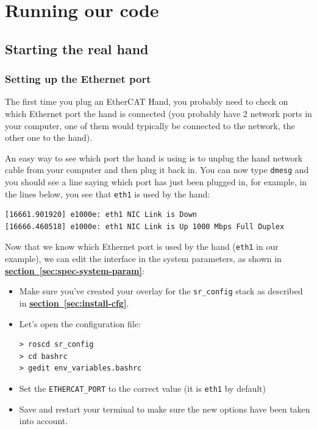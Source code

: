 \documentclass[12pt]{article}
\newcommand{\link}[1]{\hyperref[sec:#1]{\textbf{section~\ref*{sec:#1}}}}
\begin{document}
\newpage

\section{Running our code}
\label{sec:running-our-code}

\subsection{Starting the real hand}
\label{sec:starting-real-hand}

\subsubsection{Setting up the Ethernet port}
\par The first time you plug an EtherCAT Hand, you probably need to check on which Ethernet port the hand is connected (you probably have 2 network ports in your computer, one of them would typically be connected to the network, the other one to the hand).\\

\par An easy way to see which port the hand is using is to unplug the hand network cable from your computer and then plug it back in. You can now type \texttt{dmesg} and you should see a line saying which port has just been plugged in, for example, in the lines below, you see that \texttt{eth1} is used by the hand:
  \begin{lstlisting}[escapeinside='']
[16661.901920] e1000e: eth1 NIC Link is Down
[16666.460518] e1000e: eth1 NIC Link is Up 1000 Mbps Full Duplex
  \end{lstlisting}

\par Now that we know which Ethernet port is used by the hand (\texttt{eth1} in our example), we can edit the interface in the system parameters, as shown in \link{spec-system-param}:
\begin{itemize}
\item Make sure you've created your overlay for the \texttt{sr\_config} stack as described in \link{install-cfg}.
\item Let's open the configuration file:
  \begin{lstlisting}[escapeinside='']
> roscd sr_config
> cd bashrc
> gedit env_variables.bashrc
  \end{lstlisting}
\item Set the \texttt{ETHERCAT\_PORT} to the correct value (it is \texttt{eth1} by default)
\item Save and restart your terminal to make sure the new options have been taken into account.
\end{itemize}
\end{document}
